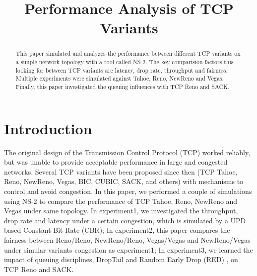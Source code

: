 \documentclass[10pt, conference]{lib/IEEEtran}
\begin{document}
\title{Performance Analysis of TCP Variants}

\author{
\and
{}
}
\maketitle


\begin{abstract}
This paper simulated and analyzes the performance between different TCP variants on a simple network topology with a tool called NS-2. The key comparision factors this looking for between TCP variants are latency, drop rate, throughput and fairness. Multiple experiments were simulated against Tahoe, Reno, NewReno and Vegas. Finally, this paper investigated the queuing influences with TCP Reno and SACK.
\end{abstract}


\section{Introduction}
The original design of the Transmission Control Protocol (TCP) worked 
reliably, but was unable to provide acceptable performance in large 
and congested networks. Several TCP variants have been proposed since 
then (TCP Tahoe, Reno, NewReno, Vegas, BIC, CUBIC, SACK, and others) 
with mechanisms to control and avoid congestion. In this paper, we 
performed a couple of simulations using NS-2 to compare the 
performance of TCP Tahoe, Reno, NewReno and Vegas under same topology. 
In experiment1, we investigated the throughput, drop rate and latency 
under a certain congestion, which is simulated by a UPD based Constant 
Bit Rate (CBR); In experiment2, this paper compares the fairness 
between Reno/Reno, NewReno/Reno, Vegas/Vegas and NewReno/Vegas under 
simular variants congestion as experiment1; In experiment3, we learned 
the impact of queuing disciplines, DropTail and Random Early Drop (RED)
, on TCP Reno and SACK.
\end{document}

